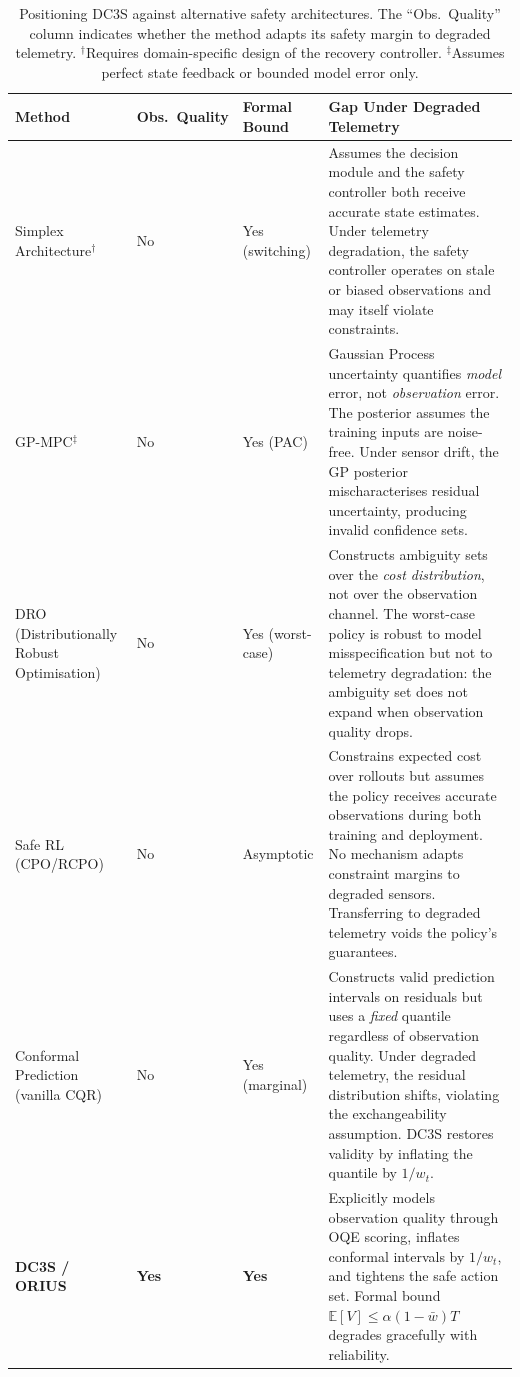 \begin{table}[htbp]
\centering
\caption{Positioning DC3S against alternative safety architectures.
  The ``Obs.\ Quality'' column indicates whether the method adapts its
  safety margin to degraded telemetry.  $^\dagger$Requires domain-specific
  design of the recovery controller.  $^\ddagger$Assumes perfect state
  feedback or bounded model error only.}
\label{tab:safety-comparison}
\begin{tabular}{p{3.0cm}p{2.0cm}p{2.0cm}p{5.5cm}}
\toprule
\textbf{Method} & \textbf{Obs.\ Quality} & \textbf{Formal Bound} & \textbf{Gap Under Degraded Telemetry} \\
\midrule
Simplex Architecture$^\dagger$
  & No
  & Yes (switching)
  & Assumes the decision module and the safety controller both receive
    accurate state estimates.  Under telemetry degradation, the safety
    controller operates on stale or biased observations and may itself
    violate constraints. \\
\addlinespace
GP-MPC$^\ddagger$
  & No
  & Yes (PAC)
  & Gaussian Process uncertainty quantifies \emph{model} error, not
    \emph{observation} error.  The posterior assumes the training inputs are
    noise-free.  Under sensor drift, the GP posterior mischaracterises
    residual uncertainty, producing invalid confidence sets. \\
\addlinespace
DRO (Distributionally Robust Optimisation)
  & No
  & Yes (worst-case)
  & Constructs ambiguity sets over the \emph{cost distribution}, not over the
    observation channel.  The worst-case policy is robust to model
    misspecification but not to telemetry degradation: the ambiguity
    set does not expand when observation quality drops. \\
\addlinespace
Safe RL (CPO/RCPO)
  & No
  & Asymptotic
  & Constrains expected cost over rollouts but assumes the policy
    receives accurate observations during both training and deployment.
    No mechanism adapts constraint margins to degraded sensors.
    Transferring to degraded telemetry voids the policy's guarantees. \\
\addlinespace
Conformal Prediction (vanilla CQR)
  & No
  & Yes (marginal)
  & Constructs valid prediction intervals on residuals but uses a
    \emph{fixed} quantile regardless of observation quality.  Under
    degraded telemetry, the residual distribution shifts, violating the
    exchangeability assumption.  DC3S restores validity by inflating the
    quantile by $1/w_t$. \\
\midrule
\textbf{DC3S / ORIUS}
  & \textbf{Yes}
  & \textbf{Yes}
  & Explicitly models observation quality through OQE scoring, inflates
    conformal intervals by $1/w_t$, and tightens the safe action set.
    Formal bound $\mathbb{E}[V] \le \alpha(1-\bar{w})T$ degrades
    gracefully with reliability. \\
\bottomrule
\end{tabular}
\end{table}


